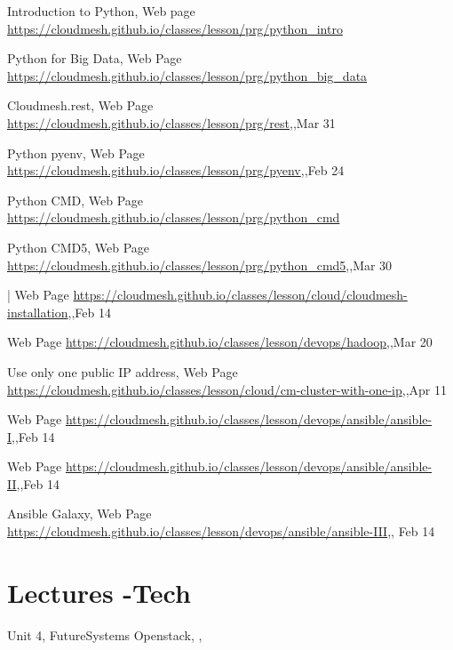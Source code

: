Introduction to Python, Web page \url{https://cloudmesh.github.io/classes/lesson/prg/python_intro}

Python for Big Data, Web Page \url{https://cloudmesh.github.io/classes/lesson/prg/python_big_data}


Cloudmesh.rest, Web Page \url{https://cloudmesh.github.io/classes/lesson/prg/rest},,Mar 31     

Python pyenv, Web Page \url{https://cloudmesh.github.io/classes/lesson/prg/pyenv},,Feb 24


Python CMD, Web Page \url{https://cloudmesh.github.io/classes/lesson/prg/python_cmd}

Python CMD5, Web Page \url{https://cloudmesh.github.io/classes/lesson/prg/python_cmd5},,Mar 30


| Web Page \url{https://cloudmesh.github.io/classes/lesson/cloud/cloudmesh-installation},,Feb 14


Web Page \url{https://cloudmesh.github.io/classes/lesson/devops/hadoop},,Mar 20

Use only one public IP address, Web Page \url{https://cloudmesh.github.io/classes/lesson/cloud/cm-cluster-with-one-ip},,Apr 11


Web Page \url{https://cloudmesh.github.io/classes/lesson/devops/ansible/ansible-I},,Feb 14


Web Page \url{https://cloudmesh.github.io/classes/lesson/devops/ansible/ansible-II},,Feb 14

Ansible Galaxy, Web Page \url{https://cloudmesh.github.io/classes/lesson/devops/ansible/ansible-III},, Feb 14


\section{Lectures -Tech}

Unit 4, FutureSystems Openstack, , 



